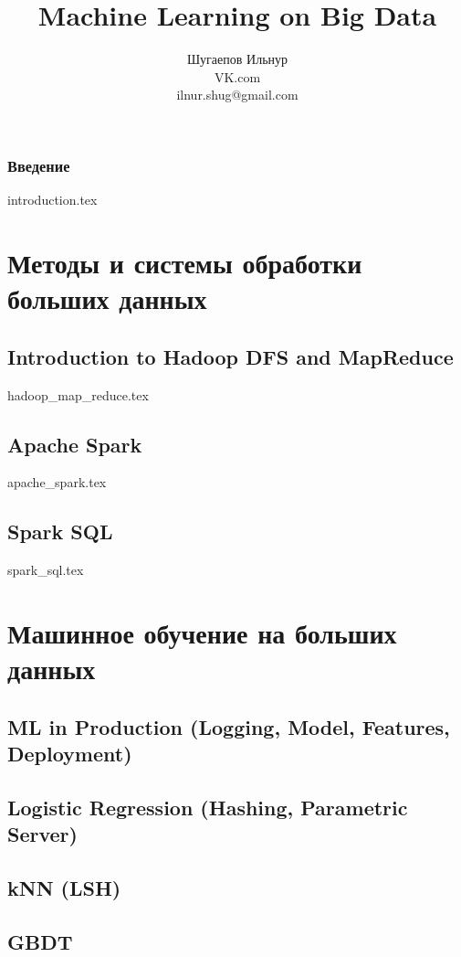 \documentclass[openany,12pt]{book}
\title{Machine Learning on Big Data}
\author{Шугаепов Ильнур 
\\
\small{VK.com} 
\\
\small{ilnur.shug@gmail.com}}
\date{}
\numberwithin{equation}{section}
\begin{document}
\maketitle

\tableofcontents

\section*{Введение}
{introduction.tex}
 
\part{Методы и системы обработки больших данных}
\chapter{Introduction to Hadoop DFS and MapReduce}
{hadoop_map_reduce.tex}


\chapter{Apache Spark}
{apache_spark.tex}

\chapter{Spark SQL}
{spark_sql.tex}

\part{Машинное обучение на больших данных}
\chapter{ML in Production (Logging, Model, Features, Deployment)}

\chapter{Logistic Regression (Hashing, Parametric Server)}

\chapter{kNN (LSH)}

\chapter{GBDT}
\end{document}
